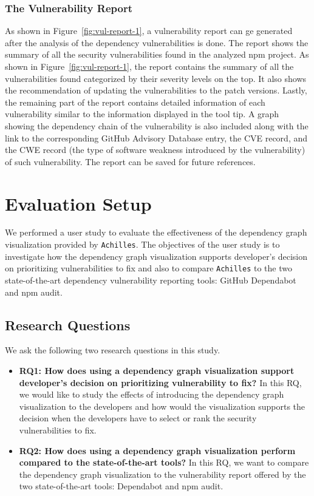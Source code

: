 \documentclass[conference]{IEEEtran}
\begin{document}
	\subsubsection{The Vulnerability Report}
	As shown in Figure~\ref{fig:vul-report-1}, a vulnerability report can ge generated after the analysis of the dependency vulnerabilities is done. The report shows the summary of all the security vulnerabilities found in the analyzed npm project. As shown in Figure~\ref{fig:vul-report-1}, the report contains the summary of all the vulnerabilities found categorized by their severity levels on the top. 
	It also shows the recommendation of updating the vulnerabilities to the patch versions. Lastly, the remaining part of the report contains detailed information of each vulnerability similar to the information displayed in the tool tip. 
	A graph showing the dependency chain of the vulnerability is also included along with the link to the corresponding GitHub Advisory Database entry, the CVE record, and the CWE record (the type of software weakness introduced by the vulnerability) of such vulnerability. 
	The report can be saved for future references.

	
	\section{Evaluation Setup}
	We performed a user study to evaluate the effectiveness of the dependency graph visualization provided by \texttt{Achilles}.
	The objectives of the user study is to investigate how the dependency graph visualization supports developer’s decision on prioritizing vulnerabilities to fix and also to compare \texttt{Achilles} to the two state-of-the-art dependency vulnerability reporting tools: GitHub Dependabot and npm audit. 
	
	\subsection{Research Questions}
	We ask the following two research questions in this study.
	
	\begin{itemize}
		\item \textbf{RQ1: How does using a dependency graph visualization support developer’s decision on prioritizing vulnerability to fix?} In this RQ, we would like to study the effects of introducing the dependency graph visualization to the developers and how would the visualization supports the decision when the developers have to select or rank the security vulnerabilities to fix.
		\item \textbf{RQ2: How does using a dependency graph visualization perform compared to the state-of-the-art tools?} In this RQ, we want to compare the dependency graph visualization to the vulnerability report offered by the two state-of-the-art tools: Dependabot and npm audit.
	\end{itemize}
	
\end{document}
